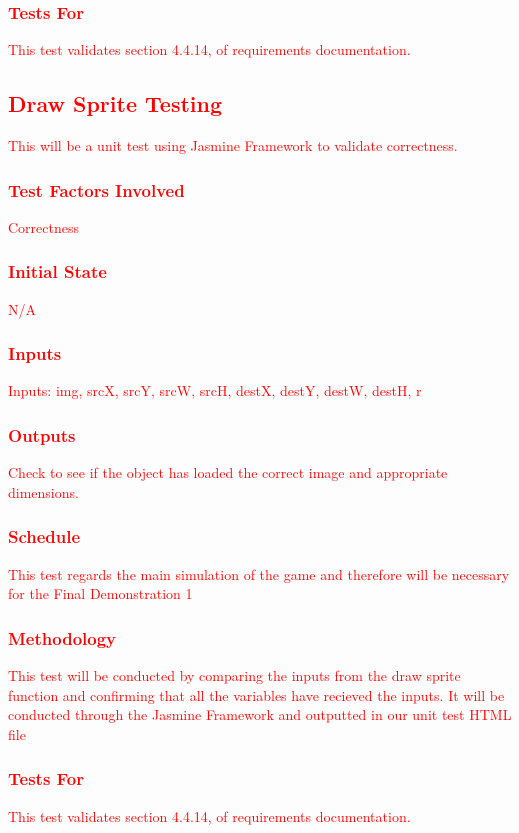 \documentclass[11pt, oneside]{article}   	%
\begin{document}
\subsubsection{\textcolor{red}{Tests For}}
\textcolor{red}{This test validates section 4.4.14, of requirements documentation.}



\subsection{\textcolor{red}{Draw Sprite Testing}}
\textcolor{red}{This will be a unit test using Jasmine Framework to validate correctness.}
\subsubsection{\textcolor{red}{Test Factors Involved}}
\textcolor{red}{Correctness}
\subsubsection{\textcolor{red}{Initial State}}
\textcolor{red}{N/A}
\subsubsection{\textcolor{red}{Inputs}}
\textcolor{red}{Inputs: img, srcX, srcY, srcW, srcH, destX, destY, destW, destH, r}
\subsubsection{\textcolor{red}{Outputs}}
\textcolor{red}{Check to see if the object has loaded the correct image and appropriate dimensions.}
\subsubsection{\textcolor{red}{Schedule}}
\textcolor{red}{This test regards the main simulation of the game and therefore will be necessary for the Final Demonstration 1}
\subsubsection{\textcolor{red}{Methodology}}
\textcolor{red}{This test will be conducted by comparing the inputs from the draw sprite function and confirming that all the variables have recieved the inputs. It will be conducted through the Jasmine Framework and outputted in our unit test HTML file}
\subsubsection{\textcolor{red}{Tests For}}
\textcolor{red}{This test validates section 4.4.14, of requirements documentation.}
\end{document}
